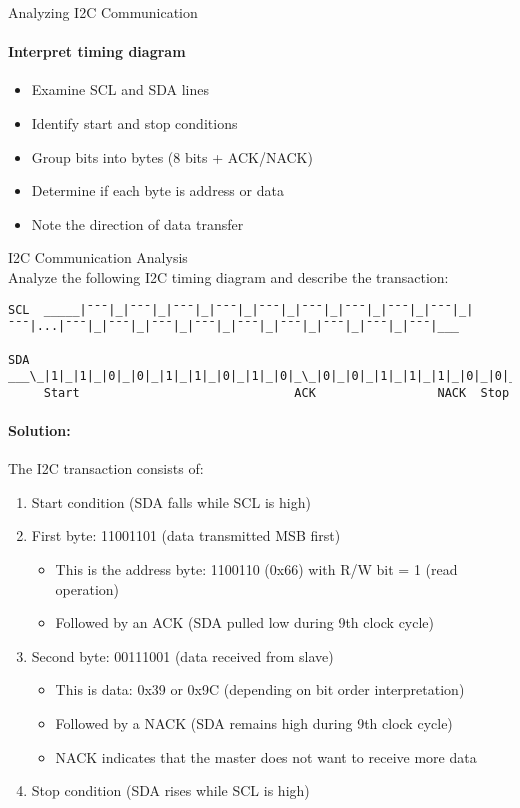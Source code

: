 \begin{KR}{Analyzing I2C Communication}
\paragraph{Interpret timing diagram}
\begin{itemize}
    \item Examine SCL and SDA lines
    \item Identify start and stop conditions
    \item Group bits into bytes (8 bits + ACK/NACK)
    \item Determine if each byte is address or data
    \item Note the direction of data transfer
\end{itemize}
\end{KR}

\begin{example2}{I2C Communication Analysis}\\
Analyze the following I2C timing diagram and describe the transaction:

\begin{verbatim}
SCL  _____|¯¯¯|_|¯¯¯|_|¯¯¯|_|¯¯¯|_|¯¯¯|_|¯¯¯|_|¯¯¯|_|¯¯¯|_|¯¯¯|_|¯¯¯|...|¯¯¯|_|¯¯¯|_|¯¯¯|_|¯¯¯|_|¯¯¯|_|¯¯¯|_|¯¯¯|_|¯¯¯|_|¯¯¯|___
                     
SDA  ___\_|1|_|1|_|0|_|0|_|1|_|1|_|0|_|1|_|0|_\_|0|_|0|_|1|_|1|_|1|_|0|_|0|_|1|_/___
     Start                              ACK                 NACK  Stop
\end{verbatim}

\tcblower
\paragraph{Solution:}
The I2C transaction consists of:
\begin{enumerate}
    \item Start condition (SDA falls while SCL is high)
    \item First byte: 11001101 (data transmitted MSB first)
    \begin{itemize}
        \item This is the address byte: 1100110 (0x66) with R/W bit = 1 (read operation)
        \item Followed by an ACK (SDA pulled low during 9th clock cycle)
    \end{itemize}
    \item Second byte: 00111001 (data received from slave)
    \begin{itemize}
        \item This is data: 0x39 or 0x9C (depending on bit order interpretation)
        \item Followed by a NACK (SDA remains high during 9th clock cycle)
        \item NACK indicates that the master does not want to receive more data
    \end{itemize}
    \item Stop condition (SDA rises while SCL is high)
\end{enumerate}


\end{example2}
